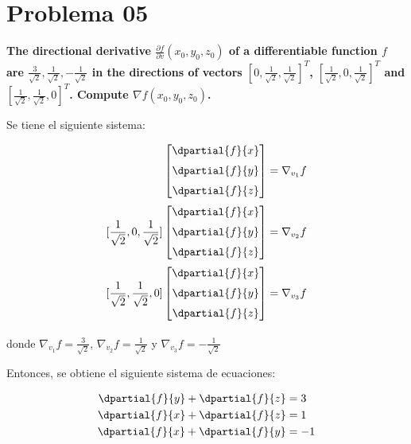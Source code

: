 \section*{Problema 05}

\textbf{The directional derivative $\frac{\partial f}{\partial v}(x_0,y_0,z_0)$ of a differentiable function $f$ are $\frac{3}{\sqrt{2}}, \frac{1}{\sqrt{2}}, -\frac{1}{\sqrt{2}}$ in the directions of vectors $[0,\frac{1}{\sqrt{2}},\frac{1}{\sqrt{2}}]^T$, $[\frac{1}{\sqrt{2}},0,\frac{1}{\sqrt{2}}]^T$ and $[\frac{1}{\sqrt{2}},\frac{1}{\sqrt{2}},0]^T$. Compute $\nabla f (x_0,y_0,z_0)$.}

Se tiene el siguiente sistema:

\begin{align*}
    [0,\frac{1}{\sqrt{2}},\frac{1}{\sqrt{2}}]
    \begin{bmatrix}
        \dpartial{f}{x} \\[6pt] \dpartial{f}{y} \\[6pt] \dpartial{f}{z}
    \end{bmatrix} & = \nabla_{v_1} f \\[3pt]
    [\frac{1}{\sqrt{2}},0,\frac{1}{\sqrt{2}}]
    \begin{bmatrix}
        \dpartial{f}{x} \\[6pt] \dpartial{f}{y} \\[6pt] \dpartial{f}{z}
    \end{bmatrix} & = \nabla_{v_2} f \\[3pt]
    [\frac{1}{\sqrt{2}},\frac{1}{\sqrt{2}},0]
    \begin{bmatrix}
        \dpartial{f}{x} \\[6pt] \dpartial{f}{y} \\[6pt] \dpartial{f}{z}
    \end{bmatrix} & = \nabla_{v_3} f \\[3pt]
\end{align*}

donde $\nabla_{v_1} f = \frac{3}{\sqrt{2}}$, $\nabla_{v_2} f = \frac{1}{\sqrt{2}}$ y $\nabla_{v_3} f = -\frac{1}{\sqrt{2}}$

Entonces, se obtiene el siguiente sistema de ecuaciones:

\begin{align*}
    \dpartial{f}{y} + \dpartial{f}{z} & = 3  \\
    \dpartial{f}{x} + \dpartial{f}{z} & = 1  \\
    \dpartial{f}{x} + \dpartial{f}{y} & = -1
\end{align*}

